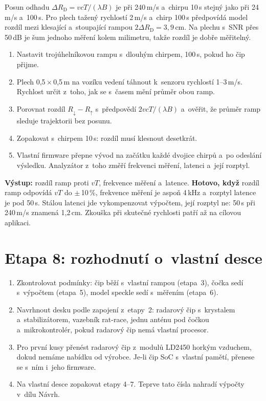 \documentclass[czech]{skyren}
\begin{document}
Posun odhadu $\Delta R_\mathrm{D} = vcT/(\lambda B)$ je při 240\,m/s
a~chirpu 10\,\textmu s stejný jako při 24\,m/s a~100\,\textmu s. Pro plech
tažený rychlostí 2\,m/s a~chirp 100\,\textmu s předpovídá model rozdíl mezi
klesající a~stoupající rampou $2\Delta R_\mathrm{D} = 3{,}9$\,cm. Na plechu
s~SNR přes 50\,dB je šum jednoho měření kolem milimetru, takže rozdíl je
dobře měřitelný.

\begin{enumerate}
\item Nastavit trojúhelníkovou rampu s~dlouhým chirpem, 100\,\textmu s,
  pokud ho čip přijme.
\item Plech 0,5\,$\times$\,0,5\,m na vozíku vedení táhnout k~senzoru
  rychlostí 1--3\,m/s. Rychlost určit z~toho, jak se s~časem mění průměr
  obou ramp.
\item Porovnat rozdíl $R_\downarrow - R_\uparrow$ s~předpovědí
  $2vcT/(\lambda B)$ a~ověřit, že průměr ramp sleduje trajektorii bez
  posunu.
\item Zopakovat s~chirpem 10\,\textmu s: rozdíl musí klesnout desetkrát.
\item Vlastní firmware přepne vývod na začátku každé dvojice chirpů a~po
  odeslání výsledku. Analyzátor z~toho změří frekvenci měření, latenci a~její
  rozptyl.
\end{enumerate}

\textbf{Výstup:} rozdíl ramp proti $vT$, frekvence měření a~latence.
\textbf{Hotovo, když} rozdíl ramp odpovídá $vT$ do $\pm$\,10\,\%, frekvence
měření je aspoň 4\,kHz a~rozptyl latence je pod 50\,\textmu s. Stálou
latenci jde vykompenzovat výpočtem, její rozptyl ne: 50\,\textmu s při
240\,m/s znamená 1,2\,cm. Zkouška při skutečné rychlosti patří až na
cílovou aplikaci.

\section{Etapa 8: rozhodnutí o~vlastní desce}

\begin{enumerate}
\item Zkontrolovat podmínky: čip běží s~vlastní rampou (etapa~3), čočka sedí
  s~výpočtem (etapa~5), model speckle sedí s~měřením (etapa~6).
\item Navrhnout desku podle zapojení z~etapy~2: radarový čip s~krystalem
  a~stabilizátorem, vazebník rat-race, jednu anténu pod čočkou
  a~mikrokontrolér, pokud radarový čip nemá vlastní procesor.
\item Pro první kusy přenést radarový čip z~modulů LD2450 horkým vzduchem,
  dokud nemáme nabídku od výrobce. Je-li čip SoC s~vlastní pamětí, přenese se
  s~ním i~jeho firmware.
\item Na vlastní desce zopakovat etapy 4--7. Teprve tato čísla nahradí
  výpočty v~dílu Návrh.
\end{enumerate}
\end{document}

